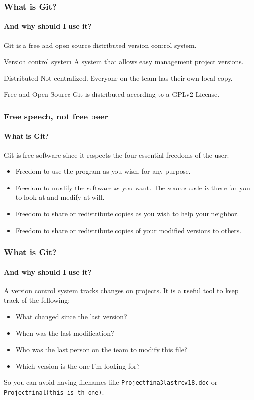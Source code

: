 \documentclass[dvipsnames, usenames]{beamer}
\newcommand{\spacepls}{\vspace{1.5Ex}}
\begin{document}
\begin{frame}[t]
	\frametitle{What is Git?}
	\framesubtitle{And why should I use it?}

	\spacepls

	Git is a {\color{OliveGreen}free and open source} \alert{distributed} {\color{Blue}version control system}. \pause

	\begin{block}{Version control system}	
		A system that allows easy management project versions.
	\end{block} \pause

	\begin{alertblock}{Distributed}	
		Not centralized. Everyone on the team has their own local copy.
	\end{alertblock} \pause

	\begin{exampleblock}{Free and Open Source}	
		Git is distributed according to a GPLv2 License.
	\end{exampleblock}
	
\end{frame}


\begin{frame}[t]
	\frametitle{Free speech, not free beer}
	\framesubtitle{What is Git?}

	Git is free software since it respects the four essential freedoms of the user: \pause

	\begin{itemize}
		\item Freedom to use the program as you wish, for any purpose. \pause
		\item Freedom to modify the software as you want. The source code is there for you to look at and modify at will. \pause
		\item Freedom to share or redistribute copies as you wish to help your neighbor. \pause
		\item Freedom to share or redistribute copies of your modified versions to others.
	\end{itemize}
	
\end{frame}

\begin{frame}[t]
	\frametitle{What is Git?}
	\framesubtitle{And why should I use it?}

	A version control system tracks changes on projects.
	It is a useful tool to keep track of the following: \pause

	\begin{itemize}
		\item What changed since the last version? \pause
		\item When was the last modification? \pause
		\item Who was the last person on the team to modify this file? \pause
		\item Which version is the one I'm looking for? \pause
	\end{itemize}

	So you can avoid having filenames like \texttt{Projectfina3lastrev18.doc} or \texttt{Projectfinal(this\_is\_th\_one)}.

\end{frame}
\end{document}
